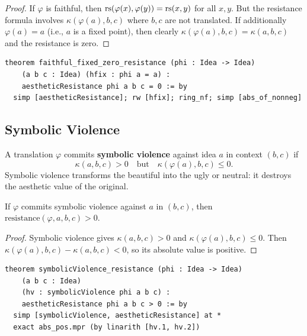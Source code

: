 \begin{proof}
If $\varphi$ is faithful, then $\mathrm{rs}(\varphi(x), \varphi(y)) = \mathrm{rs}(x, y)$
for all $x, y$.  But the resistance formula involves $\kappa(\varphi(a), b, c)$
where $b, c$ are not translated.  If additionally $\varphi(a) = a$ (i.e.,
$a$ is a fixed point), then clearly $\kappa(\varphi(a), b, c) = \kappa(a, b, c)$
and the resistance is zero.
\end{proof}

\begin{lstlisting}
theorem faithful_fixed_zero_resistance (phi : Idea -> Idea)
    (a b c : Idea) (hfix : phi a = a) :
    aestheticResistance phi a b c = 0 := by
  simp [aestheticResistance]; rw [hfix]; ring_nf; simp [abs_of_nonneg]
\end{lstlisting}

\subsection{Symbolic Violence}

\begin{definition}
\label{def:symbolic-violence}
A translation $\varphi$ commits \textbf{symbolic violence} against idea
$a$ in context $(b, c)$ if
\[
  \kappa(a, b, c) > 0
  \quad \text{but} \quad
  \kappa(\varphi(a), b, c) \leq 0.
\]
Symbolic violence transforms the beautiful into the ugly or neutral: it
destroys the aesthetic value of the original.
\end{definition}

\begin{theorem}
\label{thm:symbolic-violence-resistance}
If $\varphi$ commits symbolic violence against $a$ in $(b, c)$, then
$\mathrm{resistance}(\varphi, a, b, c) > 0$.
\end{theorem}

\begin{proof}
Symbolic violence gives $\kappa(a, b, c) > 0$ and
$\kappa(\varphi(a), b, c) \leq 0$.  Then
$\kappa(\varphi(a), b, c) - \kappa(a, b, c) < 0$, so its absolute value
is positive.
\end{proof}

\begin{lstlisting}
theorem symbolicViolence_resistance (phi : Idea -> Idea)
    (a b c : Idea)
    (hv : symbolicViolence phi a b c) :
    aestheticResistance phi a b c > 0 := by
  simp [symbolicViolence, aestheticResistance] at *
  exact abs_pos.mpr (by linarith [hv.1, hv.2])
\end{lstlisting}

